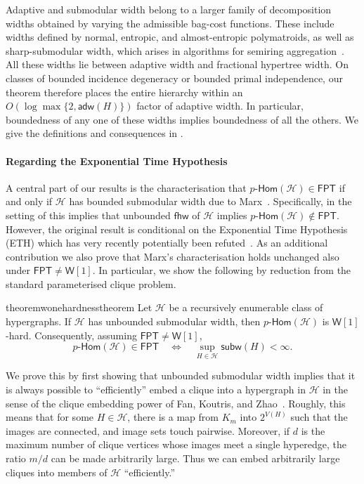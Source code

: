 \documentclass[11pt,letterpaper]{article}
\theoremstyle{definition}
\theoremstyle{remark}
\newcommand{\cH}{\mathcal H}
\newcommand{\pHom}{p\text{-}\mathsf{Hom}}
\newcommand{\fhw}{\mathsf{fhw}}
\newcommand{\adw}{\mathsf{adw}}
\newcommand{\subw}{\mathsf{subw}}
\newcommand{\FPT}{\ensuremath{\mathsf{FPT}}}
\newcommand{\wone}{\ensuremath{\mathsf{W}[1]}}
\providecommand{\adw}{\operatorname{adw}}
\providecommand{\subw}{\operatorname{subw}}
\providecommand{\fhw}{\operatorname{fhw}}
\providecommand{\FPT}{\ensuremath{\mathsf{FPT}}}
\begin{document}
Adaptive and submodular width belong to a larger family of decomposition widths obtained by varying the admissible bag-cost functions. These include widths defined by normal, entropic, and almost-entropic polymatroids, as well as sharp-submodular width, which arises in algorithms for semiring aggregation~\cite{KhamisEtAl2019FAQAI,KhamisEtAl2024LpBounds,Suciu2023InformationInequalities}. All these widths lie between adaptive width and fractional hypertree width. On classes of bounded incidence degeneracy or bounded primal independence, our theorem therefore places the entire hierarchy within an $O(\log\max\{2,\adw(H)\})$ factor of adaptive width. In particular, boundedness of any one of these widths implies boundedness of all the others. We give the definitions and consequences in .

\medskip
\paragraph{Regarding the Exponential Time Hypothesis}
A central part of our results is the characterisation that $\pHom(\cH)\in \FPT$ if and only if $\cH$ has bounded submodular width due to Marx~\cite{Marx13}. Specifically, in the setting of  this implies that unbounded $\fhw$ of $\cH$ implies   $\pHom(\cH)\not\in \FPT$. However, the original result is conditional on the Exponential Time Hypothesis (ETH) which has very recently potentially been refuted~\cite{openaieth,anthropiceth}. As an additional contribution we also prove that Marx's characterisation holds unchanged also under $\FPT \ne \wone$. In particular, we show the following by reduction from the standard parameterised clique problem.
\begin{restatable}[{Marx's theorem~\cite{Marx13} under $\FPT \ne \wone$}]{theorem}{wonehardnesstheorem}
\label{thm:wone}
Let $\cH$ be a recursively enumerable class of hypergraphs.
If $\cH$ has unbounded submodular width, then
$\pHom(\cH)$ is $\wone$-hard.
Consequently, assuming $\FPT\ne\wone$,
\[
 \pHom(\cH)\in\FPT
 \quad\Longleftrightarrow\quad
 \sup_{H\in\cH}\subw(H)<\infty.
\]
\end{restatable}
We prove this by first showing that unbounded submodular width implies that it is always possible to ``efficiently'' embed a clique into a hypergraph in $\cH$ in the sense of the clique embedding power of Fan, Koutris, and Zhao~\cite{stocCliqueEmbedding2023}. Roughly, this means that for some $H \in \cH$, there is a map from $K_m$ into $2^{V(H)}$ such that the images are connected, and image sets touch pairwise. Moreover, if $d$ is the maximum number of clique vertices whose images meet a single hyperedge, the ratio $m/d$ can be made arbitrarily large. Thus we can embed arbitrarily large cliques into members of $\cH$ ``efficiently.''
\end{document}
